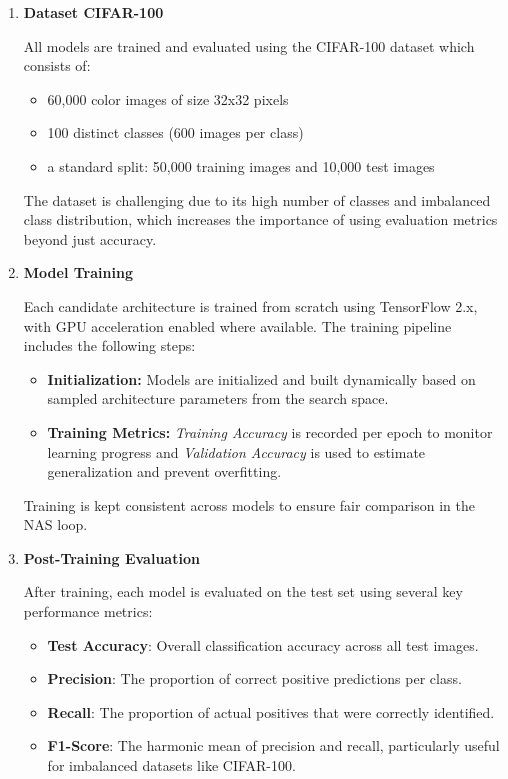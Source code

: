 \begin{enumerate}

    \item \textbf{Dataset CIFAR-100}
    
    All models are trained and evaluated using the CIFAR-100 dataset which consists of:
\begin{itemize}
    \item 60,000 color images of size 32x32 pixels
    \item 100 distinct classes (600 images per class)
\item a standard split: 50,000 training images and 10,000 test images

\end{itemize}
The dataset is challenging due to its high number of classes and imbalanced class distribution, which increases the importance of using evaluation metrics beyond just accuracy.
    \item \textbf{Model Training}

    Each candidate architecture is trained from scratch using TensorFlow 2.x, with GPU acceleration enabled where available. The training pipeline includes the following steps:
\begin{itemize}
    \item \textbf{Initialization:} Models are initialized and built dynamically based on sampled architecture parameters from the search space.
    \item \textbf{Training Metrics:} \textit{Training Accuracy} is recorded per epoch to monitor learning progress and \textit{Validation Accuracy} is used to estimate generalization and prevent overfitting.

\end{itemize}

Training is kept consistent across models to ensure fair comparison in the NAS loop.
\item \textbf{Post-Training Evaluation}

After training, each model is evaluated on the test set using several key performance metrics: 
\begin{itemize}
    \item \textbf{Test Accuracy}: Overall classification accuracy across all test images.
    \item \textbf{Precision}: The proportion of correct positive predictions per class.
    \item \textbf{Recall}: The proportion of actual positives that were correctly identified.
    \item \textbf{F1-Score}: The harmonic mean of precision and recall, particularly useful for imbalanced datasets like CIFAR-100.



\end{itemize}
\end{enumerate}

